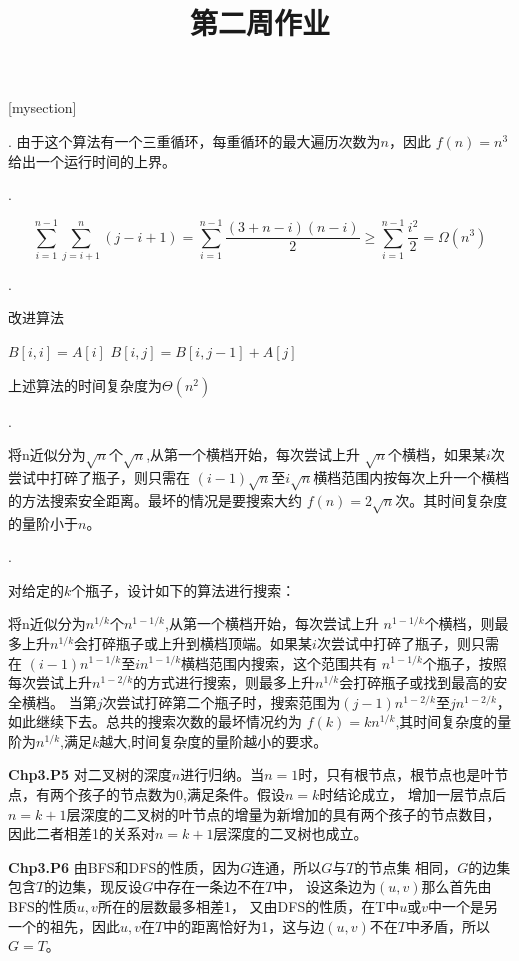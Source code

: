 \documentclass{article}
\begin{document}
\title{第二周作业}
\maketitle
{}
[mysection]
\addtocounter{mysection}{6} %
\addtocounter{mysubsection}{1} %

.
由于这个算法有一个三重循环，每重循环的最大遍历次数为$n$，因此
$f(n)=n^3$给出一个运行时间的上界。


.

\[
\sum_{i=1}^{n-1}\sum_{j=i+1}^n(j-i+1)=\sum_{i=1}^{n-1}\frac{(3+n-i)(n-i)}{2}\geq \sum_{i=1}^{n-1}\frac{i^2}{2}=\Omega(n^3)
\]

.
\begin{algorithm}
\caption{改进算法}
\begin{algorithmic}
   \STATE $B[i,i]=A[i]$
		\STATE $B[i,j]=B[i,j-1]+A[j]$
	\ENDFOR	
\ENDFOR
\end{algorithmic}
\end{algorithm}

上述算法的时间复杂度为$\Theta(n^2)$

\addtocounter{mysection}{2}
.

将n近似分为$\sqrt{n}$个$\sqrt{n}$,从第一个横档开始，每次尝试上升
$\sqrt{n}$个横档，如果某$i$次尝试中打碎了瓶子，则只需在
$(i-1)\sqrt{n}$至$i\sqrt{n}$横档范围内按每次上升一个横档的方法搜索安全距离。最坏的情况是要搜索大约
$f(n)=2\sqrt{n}$次。其时间复杂度的量阶小于$n$。

.

对给定的$k$个瓶子，设计如下的算法进行搜索：

将n近似分为$n^{1/k}$个$n^{1-1/k}$,从第一个横档开始，每次尝试上升
$n^{1-1/k}$个横档，则最多上升$n^{1/k}$会打碎瓶子或上升到横档顶端。如果某$i$次尝试中打碎了瓶子，则只需在
$(i-1)n^{1-1/k}$至$in^{1-1/k}$横档范围内搜索，这个范围共有
$n^{1-1/k}$个瓶子，按照每次尝试上升$n^{1-2/k}$的方式进行搜索，则最多上升$n^{1/k}$会打碎瓶子或找到最高的安全横档。
当第$j$次尝试打碎第二个瓶子时，搜索范围为$(j-1)n^{1-2/k}$至$jn^{1-2/k}$，
如此继续下去。总共的搜索次数的最坏情况约为
$f(k)=kn^{1/k}$,其时间复杂度的量阶为$n^{1/k}$,满足$k$越大,时间复杂度的量阶越小的要求。

\textbf{Chp3.P5}
对二叉树的深度$n$进行归纳。当$n=1$时，只有根节点，根节点也是叶节点，有两个孩子的节点数为$0$,满足条件。假设$n=k$时结论成立，
增加一层节点后$n=k+1$层深度的二叉树的叶节点的增量为新增加的具有两个孩子的节点数目，因此二者相差1的关系对$n=k+1$层深度的二叉树也成立。

\textbf{Chp3.P6}
由BFS和DFS的性质，因为$G$连通，所以$G$与$T$的节点集
相同，$G$的边集包含$T$的边集，现反设$G$中存在一条边不在$T$中，
设这条边为$(u,v)$那么首先由BFS的性质$u,v$所在的层数最多相差1，
又由DFS的性质，在T中$u$或$v$中一个是另一个的祖先，因此$u,v$在$T$中的距离恰好为1，这与边$(u,v)$不在$T$中矛盾，所以$G=T$。
\end{document}
